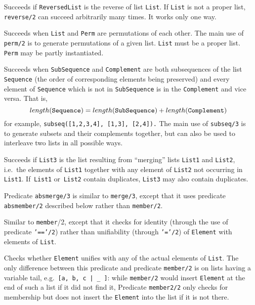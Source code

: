 \begin{description}
    Succeeds if {\tt ReversedList} is the reverse of list {\tt List}.
    If {\tt List} is not a proper list, {\tt reverse/2} can succeed
    arbitrarily many times.  It works only one way.

    Succeeds when {\tt List} and {\tt Perm} are permutations of each
    other.  The main use of {\tt perm/2} is to generate permutations
    of a given list.  {\tt List} must be a proper list.
    {\tt Perm} may be partly instantiated.

    Succeeds when {\tt SubSequence} and {\tt Complement} are both
    subsequences of the list {\tt Sequence} (the order of corresponding
    elements being preserved) and every element of {\tt Sequence} which
    is not in {\tt SubSequence} is in the {\tt Complement} and vice
    versa.  That is,
    \[ length({\tt Sequence}) =
		length({\tt SubSequence})+length({\tt Complement}) \]
    for example, {\tt subseq([1,2,3,4], [1,3], [2,4]).}
    The main use of {\tt subseq/3} is to generate subsets and their
    complements together, but can also be used to interleave two lists
    in all possible ways.

    Succeeds if {\tt List3} is the list resulting from ``merging'' lists 
    {\tt List1} and {\tt List2},
    i.e.\ the elements of {\tt List1} together with any element of 
    {\tt List2} not occurring in {\tt List1}.
    If~{\tt List1} or~{\tt List2} contain duplicates, {\tt List3} may 
    also contain duplicates.

    Predicate {\tt absmerge/3} is similar to {\tt merge/3}, except that 
    it uses predicate {\tt absmember/2} described below rather than 
    {\tt member/2}.

    Similar to {\tt member}/2, except that it checks for identity
    (through the use of predicate {\tt '=='/2}) rather than unifiability 
    (through {\tt '='/2}) of {\tt Element} with elements of {\tt List}.

    Checks whether {\tt Element} unifies with any of the actual elements 
    of {\tt List}.  The only difference between this predicate and 
    predicate {\tt member/2} is on lists having a variable tail, 
    e.g.\ \verb'[a, b, c | _ ]': while {\tt member/2} would insert 
    {\tt Element} at the end of such a list if it did not find it, 
    Predicate {\tt member2/2} only checks for membership but does not 
    insert the {\tt Element} into the list if it is not there.


\end{description}
